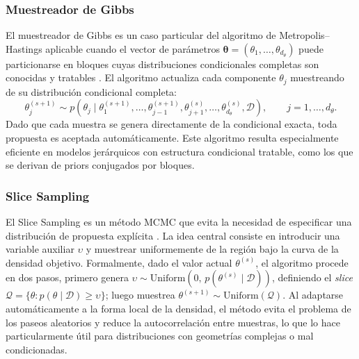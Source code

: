 \subsubsection{Muestreador de Gibbs}
\label{02_03_02_02_muestreador_gibbs}
El muestreador de Gibbs es un caso particular del algoritmo de Metropolis--Hastings aplicable cuando el vector de parámetros $\boldsymbol{\theta} = (\theta_1, \dots, \theta_{d_\theta})$ puede particionarse en bloques cuyas distribuciones condicionales completas son conocidas y tratables \citep{02_07_rizzo2007statistical}. El algoritmo actualiza cada componente $\theta_j$ muestreando de su distribución condicional completa:
\begin{equation}
    \theta_j^{(s+1)} \sim p\!\left(\theta_j \mid
    \theta_1^{(s+1)}, \dots, \theta_{j-1}^{(s+1)},
    \theta_{j+1}^{(s)}, \dots, \theta_{d_\theta}^{(s)}, \mathcal{D}\right),
    \qquad j = 1, \dots, d_\theta.
\end{equation}
Dado que cada muestra se genera directamente de la condicional exacta, toda propuesta es aceptada automáticamente. Este algoritmo resulta especialmente eficiente en modelos jerárquicos con estructura condicional tratable, como los que se derivan de priors conjugados por bloques.

\subsubsection{Slice Sampling}
\label{02_03_02_03_slice_sampling}
El Slice Sampling es un método MCMC que evita la necesidad de especificar una distribución de propuesta explícita \citep{02_07_neal2003slice}. La idea central consiste en introducir una variable auxiliar $\upsilon$ y muestrear uniformemente de la región bajo la curva de la densidad objetivo. Formalmente, dado el valor actual $\theta^{(s)}$, el algoritmo procede en dos pasos, primero genera $\upsilon \sim \mathrm{Uniform}(0,\, p(\theta^{(s)} \mid \mathcal{D}))$, definiendo el \textit{slice} $\mathcal{Q} = \{\theta : p(\theta \mid \mathcal{D}) \geq \upsilon\}$; luego muestrea $\theta^{(s+1)} \sim \mathrm{Uniform}(\mathcal{Q})$. Al adaptarse automáticamente a la forma local de la densidad, el método evita el problema de los paseos aleatorios y reduce la autocorrelación entre muestras, lo que lo hace particularmente útil para distribuciones con geometrías complejas o mal condicionadas.

